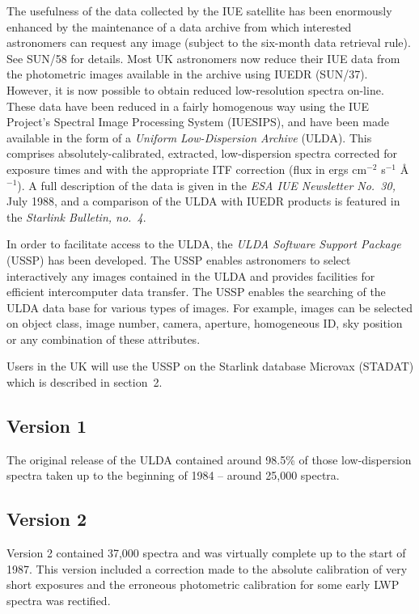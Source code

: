 The usefulness of the data collected by the IUE satellite
has been enormously enhanced by the maintenance of a data archive
from which interested astronomers can request any image (subject
to the six-month data retrieval rule). See SUN/58 for details.
Most UK astronomers now reduce their IUE data from the photometric
images available in the archive using IUEDR (SUN/37).   However,
it is now possible to obtain reduced low-resolution spectra on-line.
These data have been reduced in a fairly
homogenous way using the IUE Project's Spectral Image Processing System
(IUESIPS),
and have been made available in the form of a {\it Uniform Low-Dispersion
Archive} (ULDA).
This comprises absolutely-calibrated,  extracted, low-dispersion
spectra corrected for exposure times and with the appropriate  ITF correction
(flux in ergs cm$^{-2}$  s$^{-1}$ {\AA}$^{-1}$).
A full description of the data is given in the {\it ESA IUE Newsletter No.~30,}
July 1988,
and a comparison of the ULDA with IUEDR products is featured in
the {\it Starlink Bulletin, no.~4}.

In order to facilitate access to the ULDA, the {\it ULDA Software Support
Package} (USSP) has been developed.
The USSP enables astronomers to select interactively
any images contained in the ULDA and provides facilities for efficient
intercomputer data transfer.
The USSP enables the searching of the ULDA
data base for various types of images.
For example, images can be selected on object class, image number, camera,
aperture,  homogeneous ID,
sky position or any combination of these attributes.

Users in the UK will use the USSP on the Starlink database
Microvax (STADAT) which is described in section~2.

\subsection {Version 1}

The original release of the ULDA contained around 98.5\% of those
low-dispersion spectra taken up to the beginning of 1984 -- around
25,000 spectra.

\subsection {Version 2}

Version 2  contained 37,000 spectra and was virtually complete
up to the start of 1987.
This version included a correction made to the absolute calibration
of very short exposures
and the erroneous photometric calibration for some early
LWP spectra was rectified.

